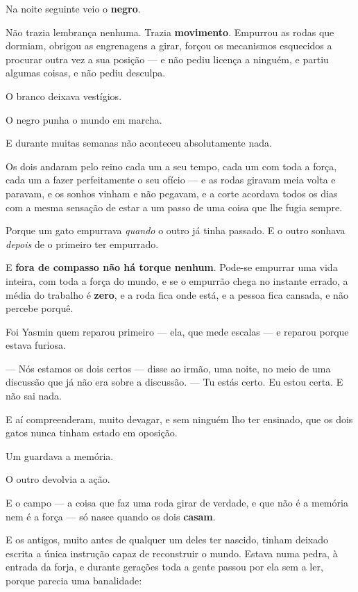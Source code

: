 \documentclass[livro.tex]{subfiles}
\begin{document}
\medskip

Na noite seguinte veio o \textbf{negro}.

Não trazia lembrança nenhuma. Trazia \textbf{movimento}. Empurrou as rodas que dormiam, obrigou as engrenagens a
girar, forçou os mecanismos esquecidos a procurar outra vez a sua posição --- e não pediu licença a ninguém, e
partiu algumas coisas, e não pediu desculpa.

O branco deixava vestígios.

O negro punha o mundo em marcha.

\medskip

E durante muitas semanas não aconteceu absolutamente nada.

Os dois andaram pelo reino cada um a seu tempo, cada um com toda a força, cada um a fazer perfeitamente o seu
ofício --- e as rodas giravam meia volta e paravam, e os sonhos vinham e não pegavam, e a corte acordava todos os
dias com a mesma sensação de estar a um passo de uma coisa que lhe fugia sempre.

Porque um gato empurrava \emph{quando} o outro já tinha passado. E o outro sonhava \emph{depois} de o primeiro
ter empurrado.

E \textbf{fora de compasso não há torque nenhum}. Pode-se empurrar uma vida inteira, com toda a força do mundo, e
se o empurrão chega no instante errado, a média do trabalho é \textbf{zero}, e a roda fica onde está, e a pessoa
fica cansada, e não percebe porquê.

\medskip

Foi Yasmin quem reparou primeiro --- ela, que mede escalas --- e reparou porque estava furiosa.

--- Nós estamos os dois certos --- disse ao irmão, uma noite, no meio de uma discussão que já não era sobre a
discussão. --- Tu estás certo. Eu estou certa. E não sai nada.

\medskip

E aí compreenderam, muito devagar, e sem ninguém lho ter ensinado, que os dois gatos nunca tinham estado em
oposição.

Um guardava a memória.

O outro devolvia a ação.

E o campo --- a coisa que faz uma roda girar de verdade, e que não é a memória nem é a força --- só nasce quando os
dois \textbf{casam}.

\medskip

E os antigos, muito antes de qualquer um deles ter nascido, tinham deixado escrita a única instrução capaz de
reconstruir o mundo. Estava numa pedra, à entrada da forja, e durante gerações toda a gente passou por ela sem a
ler, porque parecia uma banalidade:
\end{document}

